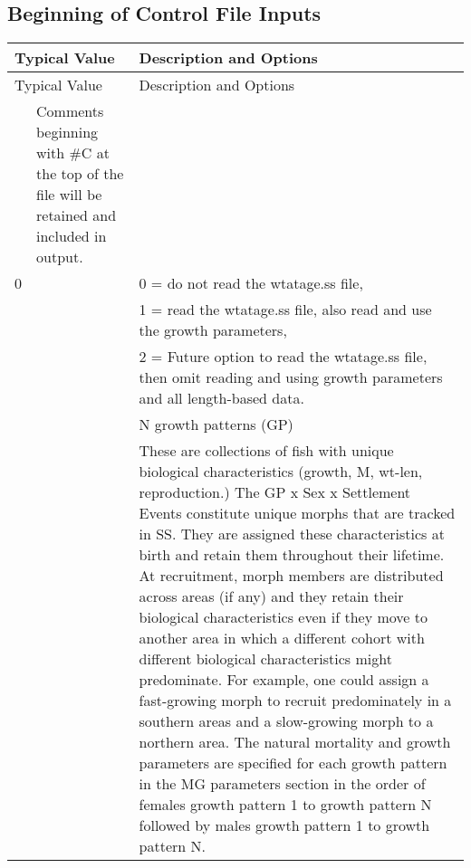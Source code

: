 \subsection{Beginning of Control File Inputs}
\begin{center}
	\begin{longtable}{p{0.5cm} p{2cm} p{12cm}}
		\hline
		\multicolumn{2}{l}{Typical Value} & Description and Options\Tstrut\Bstrut\\
		\hline
		\endfirsthead

		\hline
		\multicolumn{2}{l}{Typical Value} & Description and Options\Tstrut\Bstrut\\
		\hline
		\endhead

		\hline
		\endfoot

		\endlastfoot

		\multicolumn{2}{l}{\#C comment }\Tstrut & Comments beginning with \#C at the top of the file will be retained and included in output. \Bstrut\\
		\hline

		0 & & 0 = do not read the wtatage.ss file, \Tstrut\\
		  & & 1 = read the wtatage.ss file, also read and use the growth parameters, \\
		  & & 2 = Future option to read the wtatage.ss file, then omit reading and using growth parameters and all length-based data.\Bstrut\\

		\pagebreak
		2 & & N growth patterns (GP)\Tstrut\\
		& & These are collections of fish with unique biological characteristics (growth, M, wt-len, reproduction.)  The GP x Sex x Settlement Events constitute unique morphs that are tracked in SS.  They are assigned these characteristics at birth and retain them throughout their lifetime.  At recruitment, morph members are distributed across areas (if any) and they retain their biological characteristics even if they move to another area in which a different cohort with different biological characteristics might predominate.  For example, one could assign a fast-growing morph to recruit predominately in a southern areas and a slow-growing morph to a northern area.  The natural mortality and growth parameters are specified for each growth pattern in the MG parameters section in the order of females growth pattern 1 to growth pattern N followed by males growth pattern 1 to growth pattern N.\Bstrut\\


\end{longtable}
\end{center}
